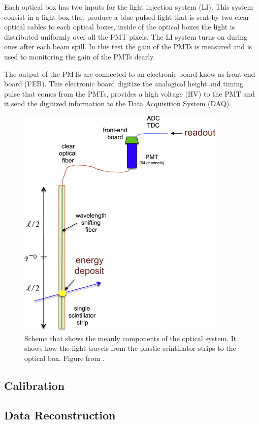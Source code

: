 Each optical box has two inputs for the light injection system (LI). This system consist in a light box that produce a blue pulsed light that is sent by two clear optical cables to each optical boxes, inside of the optical boxes the light is distributed uniformly over all the PMT pixels. The LI system turns on during ones after each beam spill. In this test the gain of the PMTs is measured and is used to monitoring the gain of the PMTs dearly. 

The output of the PMTs are connected to an electronic board know as front-end board (FEB). This electronic board digitize the analogical height and timing pulse that comes from the PMTs, provides a high voltage (HV) to the PMT and it send the digitized information to the Data Acquisition System (DAQ). 

\begin{figure}
    \centering
    \includegraphics{Figures/Chapter2/OpticalSystem.jpg}
    \caption{Scheme that shows the meanly components of the optical system. It shows how the light travels from the plastic scintillator strips to the optical box. Figure from \cite{ALIAGA2014130}.}
    \label{fig:enter-label}
\end{figure}

\subsection{Calibration}
\label{Cap:MnvExp:MnvDetector:Calibration}

\subsection{Data Reconstruction}
\label{Cap:MnvExp:MnvDetector:DataReconstruction}

